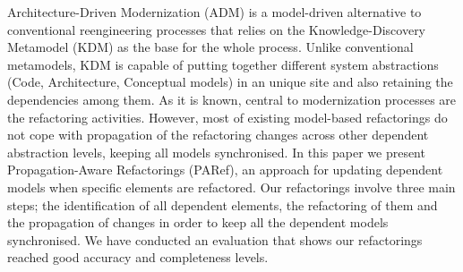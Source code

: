 %
Architecture-Driven Modernization (ADM) is a model-driven alternative to conventional reengineering processes that relies on the Knowledge-Discovery Metamodel (KDM) as the base for the whole process. Unlike conventional metamodels, KDM is capable of putting together different system abstractions (Code, Architecture, Conceptual models) in an unique site and also retaining the dependencies among them. As it is known, central to modernization processes are the refactoring activities. However, most of existing model-based refactorings do not cope with propagation of the refactoring changes across other dependent abstraction levels, keeping all models synchronised. In this paper we present Propagation-Aware Refactorings (PARef), an approach for updating dependent models when specific elements are refactored. Our refactorings involve three main steps; the identification of all dependent elements, the refactoring of them and the propagation of changes in order to keep all the dependent models synchronised. We have conducted an evaluation that shows our refactorings reached good accuracy and completeness levels.
%
%
%




